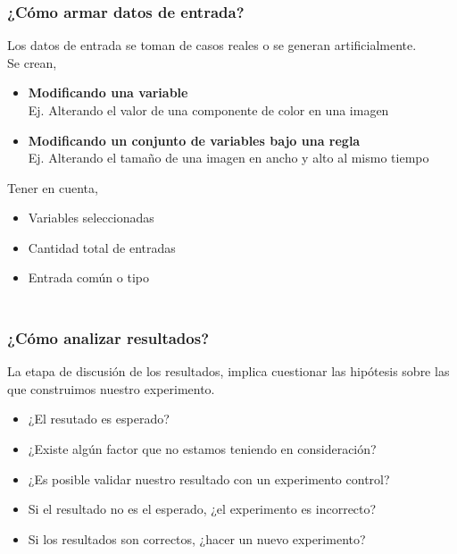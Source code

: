\documentclass[aspectratio=169]{beamer}
\newcommand{\tab}[0]{\hspace{15pt}}
\begin{document}
\begin{frame}[fragile]
    \frametitle{ \vspace{-1cm} \flushright \colorbox{verdeuca}{ \small \textcolor{white}{ \footnotesize \secname } }\\
    ¿Cómo armar datos de entrada?}
    Los datos de entrada se toman de casos reales o se generan artificialmente.\\
    \vskip 10pt \pause
    Se crean,
    \begin{itemize}
     \item \normalsize \textbf{Modificando una variable}\\
     \tab \scriptsize \textcolor{black!50}{Ej. Alterando el valor de una componente de color en una imagen}
     \item \normalsize \textbf{Modificando un conjunto de variables bajo una regla}\\
     \tab \scriptsize \textcolor{black!50}{Ej. Alterando el tamaño de una imagen en ancho y alto al mismo tiempo}
    \end{itemize}
    \vskip 10pt \pause
    Tener en cuenta,
    \begin{itemize}
     \item \normalsize Variables seleccionadas
     \item \normalsize Cantidad total de entradas
     \item \normalsize Entrada común o tipo
    \end{itemize}
\end{frame}

\begin{frame}[fragile]
    \frametitle{ \vspace{-1cm} \flushright \colorbox{verdeuca}{ \small \textcolor{white}{ \footnotesize \secname } }\\
    ¿Cómo analizar resultados?}
    La etapa de discusión de los resultados, implica cuestionar las hipótesis sobre las que construimos nuestro experimento.
    \vskip 10pt
    \small
    \begin{itemize}
     \item ¿El resutado es esperado?
     \vskip 5pt
     \item ¿Existe algún factor que no estamos teniendo en consideración?
     \vskip 5pt
     \item ¿Es posible validar nuestro resultado con un experimento control?
     \vskip 5pt
     \item Si el resultado no es el esperado, ¿el experimento es incorrecto?
     \vskip 5pt
     \item Si los resultados son correctos, ¿hacer un nuevo experimento?
    \end{itemize}
\end{frame}
\end{document}
